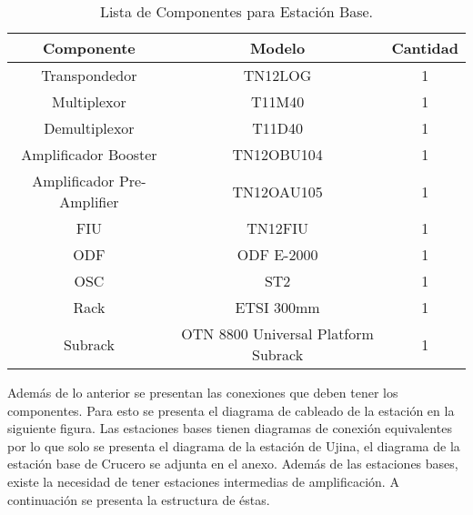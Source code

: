 \documentclass[letterpaper,11pt]{article} %
\begin{document}
\begin{table}[H]
\begin{tabular}{|c|c|c|}
\hline
\textbf{Componente}        & \textbf{Modelo} & \textbf{Cantidad} \\ \hline
Transpondedor              & TN12LOG         & 1                 \\ \hline
Multiplexor                & T11M40          & 1                 \\ \hline
Demultiplexor              & T11D40          & 1                 \\ \hline
Amplificador Booster       & TN12OBU104      & 1                 \\ \hline
Amplificador Pre-Amplifier & TN12OAU105      & 1                 \\ \hline
FIU                        & TN12FIU         & 1                 \\ \hline
ODF                        & ODF E-2000      & 1                 \\ \hline
OSC                        & ST2             & 1                 \\ \hline
Rack                       & ETSI 300mm      & 1                  \\ \hline
Subrack                    & OTN 8800 Universal Platform Subrack & 1                  \\ \hline
\end{tabular}
\caption{Lista de Componentes para Estación Base.}
\end{table}

\newp
Además de lo anterior se presentan las conexiones que deben tener los componentes. Para esto se presenta el diagrama de cableado de la estación en la siguiente figura.
\newp
Las estaciones bases tienen diagramas de conexión equivalentes por lo que solo se presenta el diagrama de la estación de Ujina, el diagrama de la estación base de Crucero se adjunta en el anexo.
\newp
Además de las estaciones bases, existe la necesidad de tener estaciones intermedias de amplificación. A continuación se presenta la estructura de éstas.
\end{document}
